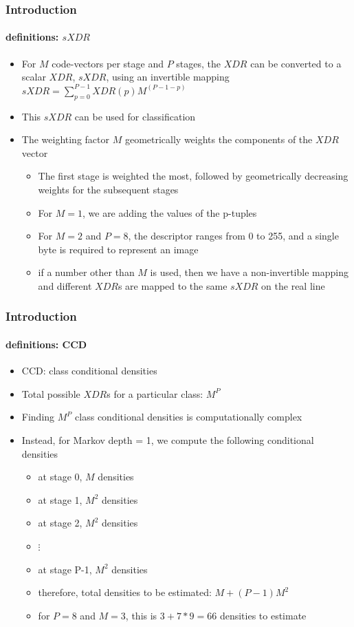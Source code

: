 \begin{frame}
\frametitle{Introduction}
\framesubtitle{definitions:  $sXDR$}
\logoCSIPCPL\mypagenum
	\begin{itemize}
		\item For $M$ code-vectors per stage and $P$ stages, the $XDR$ can be converted to a scalar $XDR$, $sXDR$, using an invertible mapping $sXDR=\sum_{p=0}^{P-1}XDR(p)M^{(P-1-p)}$
		\item This $sXDR$ can be used for classification
		\item The weighting factor $M$ geometrically weights the components of the $XDR$ vector 
			\begin{itemize}
				\item The first stage is weighted the most, followed by geometrically decreasing weights for the subsequent stages
				\item For $M=1$, we are adding the values of the p-tuples
				\item For $M=2$ and $P=8$, the descriptor ranges from 0 to 255, and a single byte is required to represent an image
				\item if a number other than $M$ is used, then we have a non-invertible mapping and different $XDR$s are mapped to the same $sXDR$ on the real line
			\end{itemize}
	\end{itemize}
\end{frame}




\begin{frame}
\frametitle{Introduction}
\framesubtitle{definitions: CCD}
\logoCSIPCPL\mypagenum
	\begin{itemize}
		\item CCD: class conditional densities
		\item Total possible $XDR$s for a particular class: $M^P$
		\item Finding $M^P$ class conditional densities is computationally complex
		\item Instead, for Markov depth = 1, we compute the following conditional densities
			\begin{itemize}
				\item at stage 0, $M$ densities
				\item at stage 1, $M^2$ densities
				\item at stage 2, $M^2$ densities
				\item $\vdots$
				\item at stage P-1, $M^2$ densities
				\item therefore, total densities to be estimated: $M + (P-1)M^2$
				\item for $P=8$ and $M=3$, this is $3+7*9=66$ densities to estimate
			\end{itemize}
	\end{itemize}
\end{frame}



